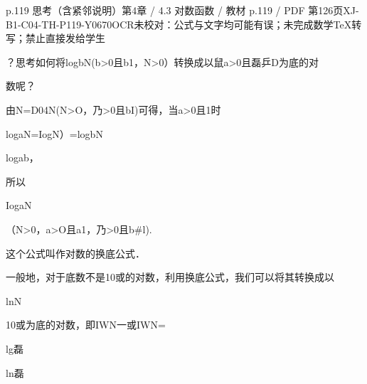 \begin{bankitem}{p.119 思考（含紧邻说明）}{第4章 / 4.3 对数函数 / 教材 p.119 / PDF 第126页}{XJ-B1-C04-TH-P119-Y0670}{OCR未校对：公式与文字均可能有误；未完成数学TeX转写；禁止直接发给学生}
\begin{ocrdraft}
\par
？思考如何将logbN(b>0且b1，N>0）转换成以鼠a>0且磊乒D为底的对
\par
数呢？
\par
由N=D04N(N>O，乃>0且bI)可得，当a>0且1时
\par
logaN=IogN）=logbN
\par
logab，
\par
所以
\par
IogaN
\par
（N>0，a>O且a1，乃>0且b\#l).
\par
这个公式叫作对数的换底公式．
\par
一般地，对于底数不是10或的对数，利用换底公式，我们可以将其转换成以
\par
lnN
\par
10或为底的对数，即IWN一或IWN=
\par
lg磊
\par
ln磊
\end{ocrdraft}
\end{bankitem}
